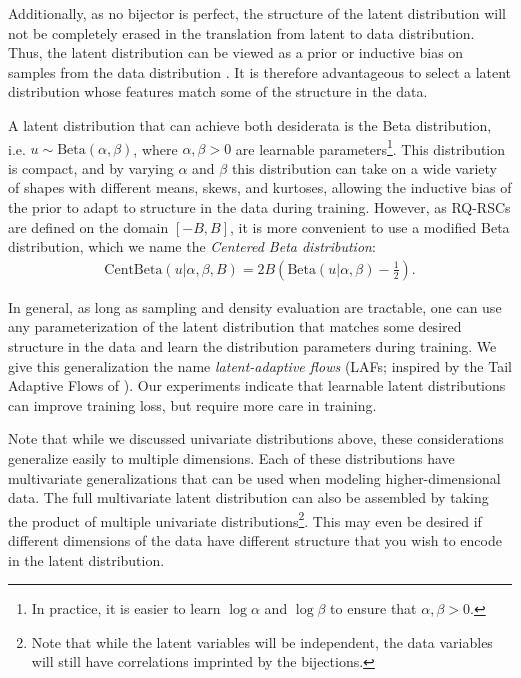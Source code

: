 \documentclass[twocolumn]{aastex631}
\begin{document}
Additionally, as no bijector is perfect, the structure of the latent distribution will not be completely erased in the translation from latent to data distribution.
Thus, the latent distribution can be viewed as a prior or inductive bias on samples from the data distribution \citep{jaini2020}.
It is therefore advantageous to select a latent distribution whose features match some of the structure in the data.

A latent distribution that can achieve both desiderata is the Beta distribution, i.e. $u \sim \mathrm{Beta}(\alpha, \beta)$, where $\alpha, \beta > 0$ are learnable parameters\footnote{In practice, it is easier to learn $\log\alpha$ and $\log\beta$ to ensure that $\alpha, \beta > 0$.}.
This distribution is compact, and by varying $\alpha$ and $\beta$ this distribution can take on a wide variety of shapes with different means, skews, and kurtoses, allowing the inductive bias of the prior to adapt to structure in the data during training.
However, as RQ-RSCs are defined on the domain $[-B, B]$, it is more convenient to use a modified Beta distribution, which we name the \emph{Centered Beta distribution}:
\begin{align}
    \text{CentBeta}(u | \alpha, \beta, B) = 2B\left(\text{Beta}(u|\alpha, \beta) - \frac{1}{2}\right).
\end{align}

In general, as long as sampling and density evaluation are tractable, one can use any parameterization of the latent distribution that matches some desired structure in the data and learn the distribution parameters during training.
We give this generalization the name \emph{latent-adaptive flows} (LAFs; inspired by the Tail Adaptive Flows of \citealt{jaini2020}).
Our experiments indicate that learnable latent distributions can improve training loss, but require more care in training.

Note that while we discussed univariate distributions above, these considerations generalize easily to multiple dimensions.
Each of these distributions have multivariate generalizations that can be used when modeling higher-dimensional data.
The full multivariate latent distribution can also be assembled by taking the product of multiple univariate distributions\footnote{Note that while the latent variables will be independent, the data variables will still have correlations imprinted by the bijections.}.
This may even be desired if different dimensions of the data have different structure that you wish to encode in the latent distribution.
\end{document}

